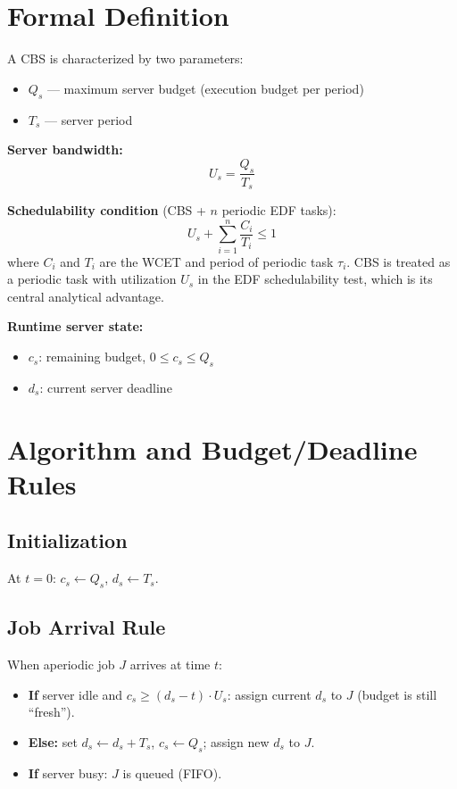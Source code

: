 \documentclass[conference]{IEEEtran}
\begin{document}
\section{Formal Definition}

A CBS is characterized by two parameters:
\begin{itemize}
  \item $Q_s$ --- maximum server budget (execution budget per period)
  \item $T_s$ --- server period
\end{itemize}

\noindent\textbf{Server bandwidth:}
\begin{equation}
  U_s = \frac{Q_s}{T_s}
  \label{eq:bandwidth}
\end{equation}

\noindent\textbf{Schedulability condition} (CBS + $n$ periodic EDF tasks):
\begin{equation}
  U_s + \sum_{i=1}^{n} \frac{C_i}{T_i} \leq 1
  \label{eq:sched}
\end{equation}
where $C_i$ and $T_i$ are the WCET and period of periodic task $\tau_i$.
CBS is treated as a periodic task with utilization $U_s$ in the EDF
schedulability test, which is its central analytical advantage.

\noindent\textbf{Runtime server state:}
\begin{itemize}
  \item $c_s$: remaining budget, $0 \leq c_s \leq Q_s$
  \item $d_s$: current server deadline
\end{itemize}

\section{Algorithm and Budget/Deadline Rules}
\label{sec:algo}

\subsection{Initialization}
At $t = 0$: $c_s \leftarrow Q_s$, $d_s \leftarrow T_s$.

\subsection{Job Arrival Rule}
When aperiodic job $J$ arrives at time $t$:
\begin{itemize}
  \item \textbf{If} server idle and $c_s \geq (d_s - t) \cdot U_s$:
        assign current $d_s$ to $J$ (budget is still ``fresh'').
  \item \textbf{Else:} set $d_s \leftarrow d_s + T_s$,
        $c_s \leftarrow Q_s$; assign new $d_s$ to $J$.
  \item \textbf{If} server busy: $J$ is queued (FIFO).
\end{itemize}
\end{document}
